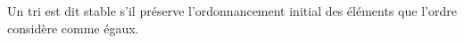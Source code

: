 \begin{defi}
Un tri est dit stable s'il préserve l’ordonnancement initial des éléments que l'ordre considère comme égaux.
\end{defi}
\ifprof
\begin{corrige}
\end{corrige}
\else
\fi

